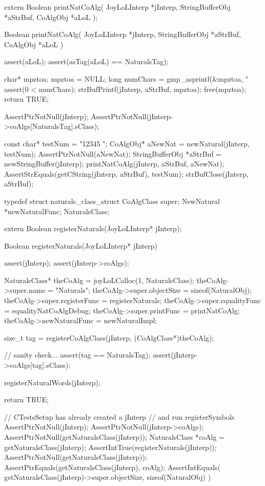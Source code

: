 
\startCHeader
extern Boolean printNatCoAlg(
  JoyLoLInterp    *jInterp,
  StringBufferObj *aStrBuf,
  CoAlgObj        *aLoL
);
\stopCHeader
{}

\startCCode
Boolean printNatCoAlg(
  JoyLoLInterp    *jInterp,
  StringBufferObj *aStrBuf,
  CoAlgObj        *aLoL
) {
  assert(aLoL);
  assert(asTag(aLoL) == NaturalsTag);

  char* mpztoa;
  mpztoa = NULL;
  long numChars = gmp_asprintf(&mpztoa, "%
  assert(0 < numChars);
  strBufPrintf(jInterp, aStrBuf, mpztoa);
  free(mpztoa);
  return TRUE;
}
\stopCCode


\startCTest
  AssertPtrNotNull(jInterp);
  AssertPtrNotNull(jInterp->coAlgs[NaturalsTag].sClass);

  const char* testNum = "12345 ";
  CoAlgObj* aNewNat = newNatural(jInterp, testNum);
  AssertPtrNotNull(aNewNat);
  StringBufferObj *aStrBuf = newStringBuffer(jInterp);
  printNatCoAlg(jInterp, aStrBuf, aNewNat);
  AssertStrEquals(getCString(jInterp, aStrBuf), testNum);
  strBufClose(jInterp, aStrBuf);
\stopCTest
\stopTestCase
\stopTestSuite

\startTestSuite[registerSymbols]

\startCHeader
typedef struct naturals_class_struct {
  CoAlgClass super;
  NewNatural *newNaturalFunc;
} NaturalsClass;
\stopCHeader

\startCHeader
extern Boolean registerNaturals(JoyLoLInterp* jInterp);
\stopCHeader
{}

\startCCode
Boolean registerNaturals(JoyLoLInterp* jInterp) {
  assert(jInterp);
  assert(jInterp->coAlgs);
  
  NaturalsClass* theCoAlg      = joyLoLCalloc(1, NaturalsClass);
  theCoAlg->super.name         = "Naturals";
  theCoAlg->super.objectSize   = sizeof(NaturalObj);
  theCoAlg->super.registerFunc = registerNaturals;
  theCoAlg->super.equalityFunc = equalityNatCoAlgDebug;
  theCoAlg->super.printFunc    = printNatCoAlg;
  theCoAlg->newNaturalFunc     = newNaturalImpl;

  size_t tag =
    registerCoAlgClass(jInterp, (CoAlgClass*)theCoAlg);
  
  // sanity check...
  assert(tag == NaturalsTag);
  assert(jInterp->coAlgs[tag].sClass);

  registerNaturalWords(jInterp);

  return TRUE;
}
\stopCCode


\startCTest
  // CTestsSetup has already created a jInterp
  // and run registerSymbols
  AssertPtrNotNull(jInterp);
  AssertPtrNotNull(jInterp->coAlgs);
  AssertPtrNotNull(getNaturalsClass(jInterp));
  NaturalsClass *coAlg = getNaturalsClass(jInterp);
  AssertIntTrue(registerNaturals(jInterp));
  AssertPtrNotNull(getNaturalsClass(jInterp));
  AssertPtrEquals(getNaturalsClass(jInterp), coAlg);
  AssertIntEquals(
    getNaturalsClass(jInterp)->super.objectSize,
    sizeof(NaturalObj)
  )
\stopCTest
\stopTestCase
\stopTestSuite
